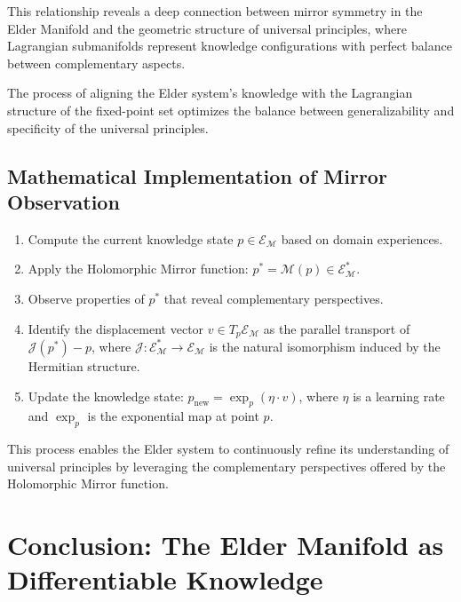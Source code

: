 This relationship reveals a deep connection between mirror symmetry in the Elder Manifold and the geometric structure of universal principles, where Lagrangian submanifolds represent knowledge configurations with perfect balance between complementary aspects.

\begin{proposition}
The process of aligning the Elder system's knowledge with the Lagrangian structure of the fixed-point set optimizes the balance between generalizability and specificity of the universal principles.
\end{proposition}

\subsection{Mathematical Implementation of Mirror Observation}

\begin{theorem}
\begin{enumerate}
\item Compute the current knowledge state $p \in \mathcal{E}_{\mathcal{M}}$ based on domain experiences.
\item Apply the Holomorphic Mirror function: $p^* = \mathcal{M}(p) \in \mathcal{E}_{\mathcal{M}}^*$.
\item Observe properties of $p^*$ that reveal complementary perspectives.
\item Identify the displacement vector $v \in T_p\mathcal{E}_{\mathcal{M}}$ as the parallel transport of $\mathcal{J}(p^*) - p$, where $\mathcal{J}: \mathcal{E}_{\mathcal{M}}^* \rightarrow \mathcal{E}_{\mathcal{M}}$ is the natural isomorphism induced by the Hermitian structure.
\item Update the knowledge state: $p_{\text{new}} = \exp_p(\eta \cdot v)$, where $\eta$ is a learning rate and $\exp_p$ is the exponential map at point $p$.
\end{enumerate}
\end{theorem}

This process enables the Elder system to continuously refine its understanding of universal principles by leveraging the complementary perspectives offered by the Holomorphic Mirror function.

\section{Conclusion: The Elder Manifold as Differentiable Knowledge}

